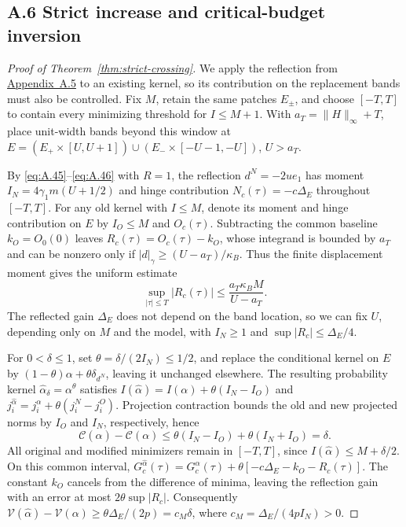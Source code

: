 \subsection{A.6 Strict increase and critical-budget inversion}\label{app:strict-crossing-proof}\nopagebreak[4]


\begin{proof}[Proof of Theorem~\ref{thm:strict-crossing}]\label{proof:strict-crossing}
We apply the reflection from \mbox{\hyperref[par:reflection]{Appendix~A.5}} to an existing kernel, so its contribution on the replacement bands must also be controlled. Fix \(M\), retain the same patches \(E_\pm\), and choose \([-T,T]\) to contain every minimizing threshold for \(I\le M+1\). With \(a_T=\|H\|_\infty+T\), place unit-width bands beyond this window at
\(E=(E_+\times[U,U+1])\cup(E_-\times[-U-1,-U])\), \(U>a_T\).

By \eqref{eq:A.45}--\eqref{eq:A.46} with \(R=1\), the reflection \(d^N=-2ue_1\) has moment \(I_N=4\gamma_1m(U+1/2)\) and hinge contribution \(N_c(\tau)=-c\Delta_E\) throughout \([-T,T]\). For any old kernel with \(I\le M\), denote its moment and hinge contribution on \(E\) by \(I_O\le M\) and \(O_c(\tau)\). Subtracting the common baseline \(k_O=O_0(0)\) leaves \(R_c(\tau)=O_c(\tau)-k_O\), whose integrand is bounded by \(a_T\) and can be nonzero only if \(|d|_\gamma\ge(U-a_T)/\kappa_B\). Thus the finite displacement moment gives the uniform estimate
\begin{equation}
\sup_{|\tau|\le T}|R_c(\tau)|\le\frac{a_T\kappa_BM}{U-a_T}. \tag{A.49}\label{eq:A.49}
\end{equation}
The reflected gain \(\Delta_E\) does not depend on the band location, so we can fix \(U\), depending only on \(M\) and the model, with \(I_N\ge1\) and \(\sup|R_c|\le\Delta_E/4\).

For \(0<\delta\le1\), set \(\theta=\delta/(2I_N)\le1/2\), and replace the conditional kernel on \(E\) by \((1-\theta)\alpha+\theta\delta_{d^N}\), leaving it unchanged elsewhere. The resulting probability kernel \(\widehat\alpha_\delta=\alpha^\theta\) satisfies \(I(\widehat\alpha)=I(\alpha)+\theta(I_N-I_O)\) and \(j_i^{\widehat\alpha}=j_i^\alpha+\theta(j_i^N-j_i^O)\). Projection contraction bounds the old and new projected norms by \(I_O\) and \(I_N\), respectively, hence
\begin{equation}
\mathcal C(\widehat\alpha)-\mathcal C(\alpha)
\le\theta(I_N-I_O)+\theta(I_N+I_O)=\delta. \tag{A.50}\label{eq:A.50}
\end{equation}
All original and modified minimizers remain in \([-T,T]\), since \(I(\widehat\alpha)\le M+\delta/2\). On this common interval, \(G_c^{\widehat\alpha}(\tau)=G_c^\alpha(\tau)+\theta[-c\Delta_E-k_O-R_c(\tau)]\). The constant \(k_O\) cancels from the difference of minima, leaving the reflection gain with an error at most \(2\theta\sup|R_c|\). Consequently \(\mathcal V(\widehat\alpha)-\mathcal V(\alpha)\ge\theta\Delta_E/(2p)=c_M\delta\), where \(c_M=\Delta_E/(4pI_N)>0\).


\end{proof}

